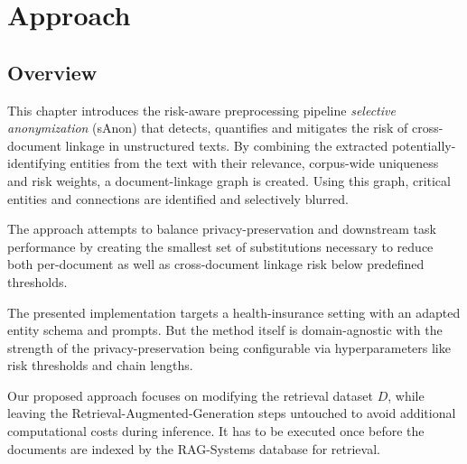 \section{Approach}\label{sec:approach}

\subsection{Overview}
This chapter introduces the risk-aware preprocessing pipeline \textit{selective anonymization} (sAnon) that detects, quantifies and mitigates the risk of cross-document linkage in unstructured texts. By combining the extracted potentially-identifying entities from the text with their relevance, corpus-wide uniqueness and risk weights, a document-linkage graph is created. Using this graph, critical entities and connections are identified and selectively blurred.

The approach attempts to balance privacy-preservation and downstream task performance by creating the smallest set of substitutions necessary to reduce both per-document as well as cross-document linkage risk below predefined thresholds.

The presented implementation targets a health-insurance setting with an adapted entity schema and prompts. But the method itself is domain-agnostic with the strength of the privacy-preservation being configurable via hyperparameters like risk thresholds and chain lengths.

Our proposed approach focuses on modifying the retrieval dataset $D$, while leaving the Retrieval-Augmented-Generation steps untouched to avoid additional computational costs during inference. It has to be executed once before the documents are indexed by the {RAG}-Systems database for retrieval.

